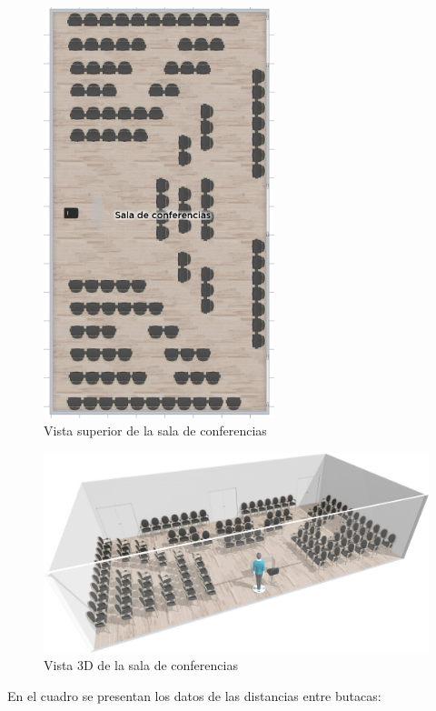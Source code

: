 \begin{figure}[H]
	\centering
	\includegraphics[width=0.6\textwidth]{./img/sala.png}
	\caption{Vista superior de la sala de conferencias}
	\label{fig:vista_sup_sala}
\end{figure}


\begin{figure}[H]
	\centering
	\includegraphics[width=1\textwidth]{./img/sala3D.png}
	\caption{Vista 3D de la sala de conferencias}
	\label{fig:vista_3D_sala}
\end{figure}


\par En el cuadro se presentan los datos de las distancias entre butacas:

